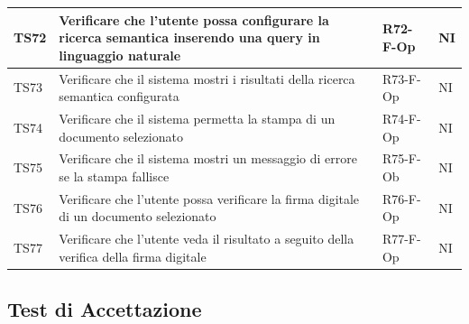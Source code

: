 \documentclass[a4paper,12pt]{article}
\begin{document}
\begin{longtable}{|M{1.2cm}|M{6.3cm}|M{2.5cm}|M{1.5cm}|}
                TS72 & Verificare che l'utente possa configurare la ricerca semantica inserendo una query in linguaggio naturale & R72-F-Op & NI \\
                \hline
                                
                TS73 & Verificare che il sistema mostri i risultati della ricerca semantica configurata & R73-F-Op & NI \\
                \hline
                                
                TS74 & Verificare che il sistema permetta la stampa di un documento selezionato & R74-F-Op & NI \\
                \hline

                TS75 & Verificare che il sistema mostri un messaggio di errore se la stampa fallisce & R75-F-Ob & NI \\
                \hline
                                
                TS76 & Verificare che l'utente possa verificare la firma digitale di un documento selezionato & R76-F-Op & NI \\
                \hline

                TS77 & Verificare che l'utente veda il risultato a seguito della verifica della firma digitale & R77-F-Op & NI \\
                \hline

            \end{longtable}

        \subsection{Test di Accettazione}
        
\end{document}
